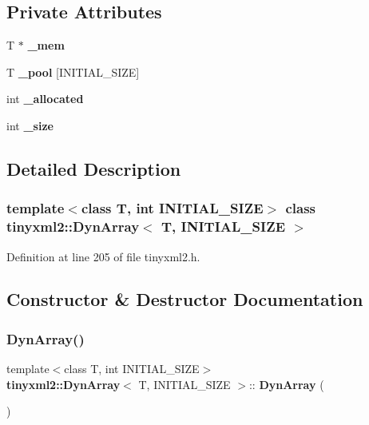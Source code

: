 \subsection*{Private Attributes}
\begin{DoxyCompactItemize}
\item 
T $\ast$ \textbf{ \+\_\+mem}
\item 
T \textbf{ \+\_\+pool} [I\+N\+I\+T\+I\+A\+L\+\_\+\+S\+I\+ZE]
\item 
int \textbf{ \+\_\+allocated}
\item 
int \textbf{ \+\_\+size}
\end{DoxyCompactItemize}


\subsection{Detailed Description}
\subsubsection*{template$<$class T, int I\+N\+I\+T\+I\+A\+L\+\_\+\+S\+I\+ZE$>$\newline
class tinyxml2\+::\+Dyn\+Array$<$ T, I\+N\+I\+T\+I\+A\+L\+\_\+\+S\+I\+Z\+E $>$}



Definition at line 205 of file tinyxml2.\+h.



\subsection{Constructor \& Destructor Documentation}
\mbox{\label{classtinyxml2_1_1_dyn_array_aaad72f384e761c70a4519183eb8fea17}} 
\subsubsection{DynArray()\hspace{0.1cm}{\footnotesize\ttfamily [1/2]}}
{\footnotesize\ttfamily template$<$class T, int I\+N\+I\+T\+I\+A\+L\+\_\+\+S\+I\+ZE$>$ \\
\textbf{ tinyxml2\+::\+Dyn\+Array}$<$ T, I\+N\+I\+T\+I\+A\+L\+\_\+\+S\+I\+ZE $>$\+::\textbf{ Dyn\+Array} (\begin{DoxyParamCaption}{ }\end{DoxyParamCaption})\hspace{0.3cm}{\ttfamily [inline]}}



